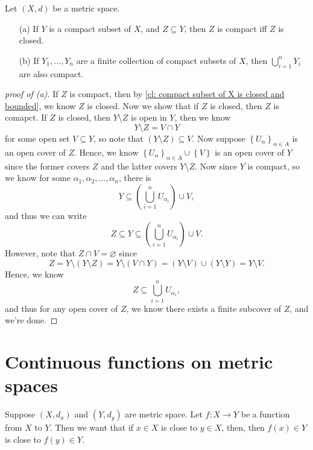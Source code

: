 \begin{theorem}
    Let \((X, d)\) be a metric space. 
    \begin{itemize}
        \item [(a)] If \(Y\) is a compact subset of \(X\), and \(Z \subseteq Y\), then \(Z\) is compact iff \(Z\) is closed.      
        \item [(b)] If \(Y_1, \dots , Y_n\) are a finite collection of compact subsets of \(X\), then \(\bigcup_{i=1}^{n} Y_i \) are also compact.   
    \end{itemize} 
\end{theorem}
\begin{proof}[proof of (a)]
    If \(Z\) is compact, then by \autoref{cl: compact subset of X is closed and bounded}, we know \(Z\) is closed. Now we show that if \(Z\) is closed, then \(Z\) is comapct. If \(Z\) is closed, then \(Y \setminus Z\) is open in \(Y\), then we know 
    \[
        Y \setminus Z = V \cap Y
    \] for some open set \(V \subseteq Y\), so note that \((Y \setminus Z) \subseteq V\). Now suppose \(\left\{ U_\alpha  \right\}_{\alpha \in A} \) is an open cover of \(Z\). Hence, we know \(\left\{ U_\alpha  \right\}_{\alpha \in A} \cup \left\{ V \right\}  \) is an open cover of \(Y\) since the former covers \(Z\) and the latter covers \(Y \setminus Z\). Now since \(Y\) is compact, so we know for some \(\alpha _1, \alpha _2, \dots , \alpha _n\), there is 
    \[
        Y \subseteq \left( \bigcup_{i=1}^{n} U_{\alpha _i} \right) \cup V, 
    \] and thus we can write
    \[
        Z \subseteq Y \subseteq \left( \bigcup_{i=1}^{n} U_{\alpha _i}  \right) \cup V. 
    \]  
    However, note that \(Z \cap V = \varnothing \) since
    \[
        Z = Y \setminus (Y \setminus Z) = Y \setminus (V \cap Y) = (Y \setminus V) \cup (Y \setminus Y) = Y \setminus V.
    \]
    Hence, we know 
    \[
        Z \subseteq \bigcup_{i=1}^{n} U_{\alpha _i}, 
    \] and thus for any open cover of \(Z\), we know there exists a finite subcover of \(Z\), and we're done.
\end{proof}










\chapter{Continuous functions on metric spaces}
Suppose \((X, d_x)\) and \((Y, d_y)\) are metric space. Let \(f: X \to Y\) be a function from \(X\) to \(Y\). Then we want that if \(x \in X\) is close to \(y \in X\), then, then \(f(x)\in Y\) is close to \(f(y) \in Y\). 


